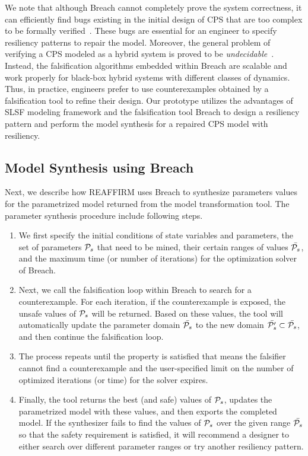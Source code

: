 We note that although Breach cannot completely prove the system correctness, it can efficiently find bugs existing in the initial design of CPS that are too complex to be formally verified~\cite{kapinski2015simulation}. These bugs are essential for an engineer to specify resiliency patterns to repair the model. 
%
Moreover, the general problem of verifying a CPS modeled as a hybrid system is proved to be \emph{undecidable}~\cite{henzinger1995s}. 
%
Instead, the falsification algorithms embedded within Breach are scalable and work properly for black-box hybrid systems with different classes of dynamics.
%
Thus, in practice, engineers prefer to use counterexamples obtained by a falsification tool to refine their design. Our prototype \toolreaffirm utilizes the advantages of SLSF modeling framework and the falsification tool Breach to design a resiliency pattern and perform the model synthesis for a repaired CPS model with resiliency.
%
\subsection{Model Synthesis using Breach}
Next, we describe how REAFFIRM uses Breach to synthesize parameters values for the parametrized model returned from the model transformation tool. The parameter synthesis procedure include following steps.

\begin{enumerate}[leftmargin= 2 em]
\item We first specify the initial conditions of state variables and parameters, the set of parameters $\P_s$ that need to be mined, their certain ranges of values $\bar{\P_s}$, and the maximum time (or number of iterations) for the optimization solver of Breach.
\item Next, we call the falsification loop within Breach to search for a counterexample. For each iteration, if the counterexample is exposed, the unsafe values of $\P_s$ will be returned. Based on these values, the tool will automatically update the parameter domain $\bar{\P_s}$ to the new domain $\bar{\P'_s} \subset \bar{\P_s}$, and then continue the falsification loop.
\item The process repeats until the property is satisfied that means the falsifier cannot find a counterexample and the user-specified limit on the number of optimized iterations (or time) for the solver expires.  
\item Finally, the tool returns the best (and safe) values of $\P_s$, updates the parametrized model with these values, and then exports the completed model. If the synthesizer fails to find the values of $\P_s$ over the given range $\bar{\P_s}$ so that the safety requirement is satisfied, it will recommend a designer to either search over different parameter ranges or try another resiliency pattern.
\end{enumerate}

